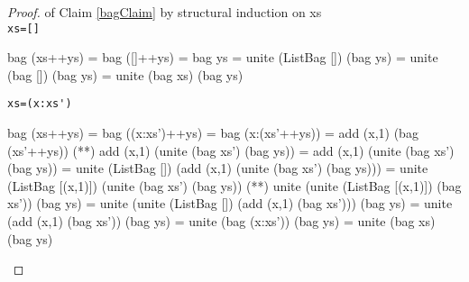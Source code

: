 \begin{proof}of Claim \ref{bagClaim} by structural induction on xs\\
\verb|xs=[]|
\begin{code}
bag (xs++ys) = bag ([]++ys)
             = bag ys
             = unite (ListBag []) (bag ys) 
             = unite (bag []) (bag ys) 
             = unite (bag xs) (bag ys) 
\end{code}
\verb|xs=(x:xs')|
\begin{code}
bag (xs++ys) = bag ((x:xs')++ys)
             = bag (x:(xs'++ys))
             = add (x,1) (bag (xs'++ys))
             (**) add (x,1) (unite (bag xs') (bag ys))
             = add (x,1) (unite (bag xs') (bag ys))
             = unite (ListBag []) (add (x,1) (unite (bag xs') (bag ys)))
             = unite (ListBag [(x,1)]) (unite (bag xs') (bag ys))
             (**) unite (unite (ListBag [(x,1)]) (bag xs')) (bag ys)
             = unite (unite (ListBag []) (add (x,1) (bag xs'))) (bag ys)
             = unite (add (x,1) (bag xs')) (bag ys)
             = unite (bag (x:xs')) (bag ys)
             = unite (bag xs) (bag ys)
\end{code}
\end{proof}
